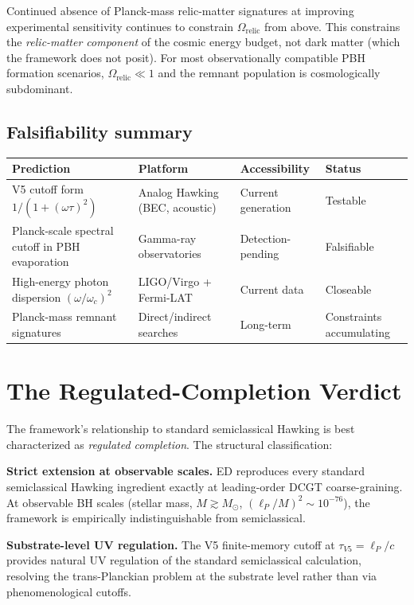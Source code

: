 \documentclass[11pt,a4paper]{article}
\begin{document}
Continued absence of Planck-mass relic-matter signatures at improving experimental sensitivity continues to constrain $\Omega_{\mathrm{relic}}$ from above. This constrains the \emph{relic-matter component} of the cosmic energy budget, not dark matter (which the framework does not posit). For most observationally compatible PBH formation scenarios, $\Omega_{\mathrm{relic}} \ll 1$ and the remnant population is cosmologically subdominant.

\subsection{Falsifiability summary}

\begin{center}
\small
\begin{tabular}{@{}p{4.4cm}p{3.6cm}p{2.6cm}p{2.4cm}@{}}
\toprule
Prediction & Platform & Accessibility & Status \\
\midrule
V5 cutoff form $1/(1+(\omega\tau)^2)$ & Analog Hawking (BEC, acoustic) & Current generation & Testable \\
Planck-scale spectral cutoff in PBH evaporation & Gamma-ray observatories & Detection-pending & Falsifiable \\
High-energy photon dispersion $(\omega/\omega_c)^2$ & LIGO/Virgo + Fermi-LAT & Current data & Closeable \\
Planck-mass remnant signatures & Direct/indirect searches & Long-term & Constraints accumulating \\
\bottomrule
\end{tabular}
\end{center}

\section{The Regulated-Completion Verdict}

The framework's relationship to standard semiclassical Hawking is best characterized as \emph{regulated completion}. The structural classification:

\textbf{Strict extension at observable scales.} ED reproduces every standard semiclassical Hawking ingredient exactly at leading-order DCGT coarse-graining. At observable BH scales (stellar mass, $M \gtrsim M_\odot$, $(\ell_P/M)^2 \sim 10^{-76}$), the framework is empirically indistinguishable from semiclassical.

\textbf{Substrate-level UV regulation.} The V5 finite-memory cutoff at $\tau_{V5} = \ell_P/c$ provides natural UV regulation of the standard semiclassical calculation, resolving the trans-Planckian problem at the substrate level rather than via phenomenological cutoffs.
\end{document}
